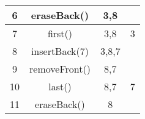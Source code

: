 \documentclass[12pt,a4paper]{article}
\begin{document}
\begin{CJK*}{UTF8}{bsmi}
\begin{enumerate}
\begin{center}
\begin{tabular}{c|ccc}
        6 & eraseBack()      & 3,8   &\\ \hline
        7 & first()          & 3,8   &3\\ \hline
        8 & insertBack(7)    & 3,8,7 &\\ \hline
        9 & removeFront()    & 8,7   &\\ \hline
        10 & last()          & 8,7   &7\\ \hline
        11 & eraseBack()     & 8     &\\ \hline
        \end{tabular}
        \end{center}
    
\end{enumerate}

\end{CJK*}
\end{document}
